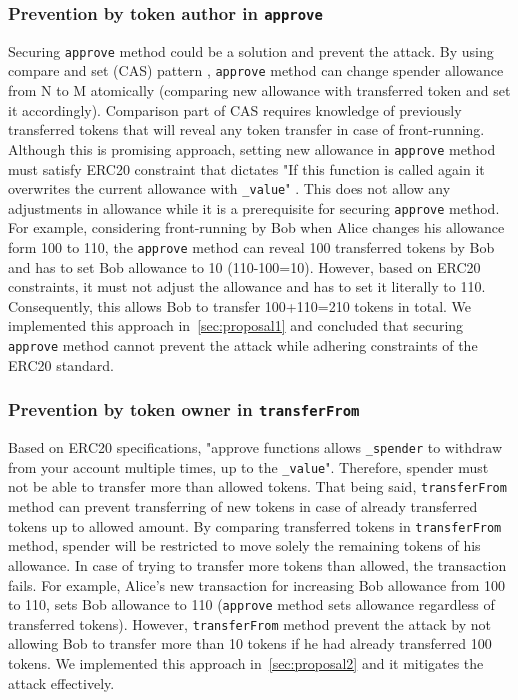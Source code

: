 \subsubsection*{Prevention by token author in \texttt{approve}} Securing \texttt{approve} method could be a solution and prevent the attack. By using compare and set (CAS) pattern \cite{Ref06}, \texttt{approve} method can change spender allowance from N to M atomically (\ie comparing new allowance with transferred token and set it accordingly). Comparison part of CAS requires knowledge of previously transferred tokens that will reveal any token transfer in case of front-running. Although this is promising approach,  setting new allowance in \texttt{approve} method must satisfy ERC20 constraint that dictates "If this function is called again it overwrites the current allowance with \texttt{\_value}" \cite{Ref08}. This does not allow any adjustments in allowance while it is a prerequisite for securing \texttt{approve} method. 
For example, considering front-running by Bob when Alice changes his allowance form 100 to 110, the \texttt{approve} method can reveal 100 transferred tokens by Bob and has to set Bob allowance to 10 (110-100=10). However, based on ERC20 constraints, it must not adjust the allowance and has to set it literally to 110. Consequently, this allows Bob to transfer 100+110=210 tokens in total. We implemented this approach in~\ref{sec:proposal1} and concluded that securing \texttt{approve} method cannot prevent the attack while adhering constraints of the ERC20 standard.
	
\subsubsection*{Prevention by token owner in \texttt{transferFrom}} Based on ERC20 specifications, "approve functions allows \texttt{\_spender} to withdraw from your account multiple times, up to the \texttt{\_value}". Therefore, spender must not be able to transfer more than allowed tokens. That being said, \texttt{transferFrom} method can prevent transferring of new tokens in case of already transferred tokens up to allowed amount. By comparing transferred tokens in \texttt{transferFrom} method, spender will be restricted to move solely the remaining tokens of his allowance. In case of trying to transfer more tokens than allowed, the transaction fails. For example, Alice's new transaction for increasing Bob allowance from 100 to 110, sets Bob allowance to 110 (\texttt{approve} method sets allowance regardless of transferred tokens). However, \texttt{transferFrom} method prevent the attack by not allowing Bob to transfer more than 10 tokens if he had already transferred 100 tokens. We implemented this approach in~\ref{sec:proposal2} and it mitigates the attack effectively.

